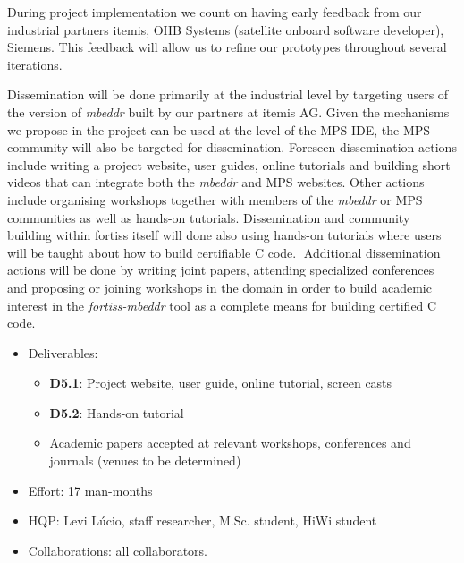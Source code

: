 During project implementation we count on having early feedback from our
industrial partners itemis, OHB Systems (satellite onboard software developer),
Siemens. This feedback will allow us to refine our prototypes throughout
several iterations.

Dissemination will be done primarily at the industrial level by targeting users
of the version of \emph{mbeddr} built by our partners at itemis AG. Given the
mechanisms we propose in the project can be used at the level of the MPS IDE,
the MPS community will also be targeted for dissemination. Foreseen
dissemination actions include writing a project website, user guides, online
tutorials and building short videos that can integrate both the \emph{mbeddr} and MPS
websites. Other actions include organising workshops together with members of
the \emph{mbeddr} or MPS communities as well as hands-on tutorials.
Dissemination and community building within fortiss itself will done also using
hands-on tutorials where users will be taught about how to build certifiable C
code.􏰁 Additional dissemination actions will be done by writing joint papers,
attending specialized conferences and proposing or joining workshops in the
domain in order to build academic interest in the \emph{fortiss-mbeddr} tool as
a complete means for building certified C code.

\begin{itemize}
  \item Deliverables:
  \begin{itemize}
    \item{\textbf{D5.1}:} Project website, user guide, online tutorial, screen
    casts
	\item{\textbf{D5.2}:} Hands-on tutorial
	\item Academic papers accepted at relevant workshops, conferences and journals
	(venues to be determined)
  \end{itemize}
  \item Effort: 17 man-months
  \item HQP: Levi L\'ucio, staff researcher, M.Sc. student, HiWi student 
  \item Collaborations: all collaborators.
\end{itemize}